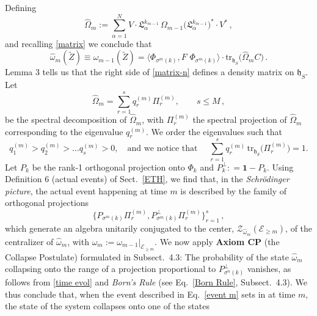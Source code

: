 \documentclass[12pt]{article}
\begin{document}
Defining
\begin{equation}\label{matrix-n}
\widehat{\Omega}_{m}:= \sum_{\alpha=1}^{N} V\cdot \mathfrak{L}_{\alpha}^{k_{m-1}} \, \Omega_{m-1}
\big(\mathfrak{L}_{\alpha}^{k_{m-1}}\big)^{*}\cdot V^{*}\,,
\end{equation}
and recalling \eqref{matrix} we conclude that
\begin{equation}\label{time evol}
\widehat{\omega}_{m}(\tilde{Z})\equiv \omega_{m-1}(\tilde{Z})= \langle \Phi_{\sigma^{m}({k})}, F\,\, \Phi_{\sigma^{m}({k})} \rangle \cdot 
\text{tr}_{\mathfrak{h}_S} \big(\widehat{\Omega}_{m} C\big)\,.
\end{equation}
Lemma 3 tells us that the right side of \eqref{matrix-n} defines a density matrix on $\mathfrak{h}_S$. Let
\begin{equation}\label{spect dec}
\widehat{\Omega}_{m} = \sum_{r=1}^{s} q_{r}^{(m)} \Pi_{r}^{(m)}, \qquad s\leq M\,,
\end{equation}
be the spectral decomposition of $\widehat{\Omega}_m$, with $\Pi_{r}^{(m)}$ the spectral projection of 
$\widehat{\Omega}_m$ corresponding to the eigenvalue $q_{r}^{(m)}$. We order the eigenvalues such that
$$q_{1}^{(m)} > q_{2}^{(m)} > \dots q_{s}^{(m)} > 0,\quad  \text{and we notice that }\quad
\sum_{r=1}^{s} q_{r}^{(m)} \,\text{tr}_{\mathfrak{h}_S}\big(\Pi_{r}^{(m)}\big) =1.$$
Let $P_{{k}}$ be the rank-1 orthogonal projection onto $\Phi_{{k}}$ and 
$P_{{k}}^{\perp}: =\mathbf{1}- P_{{k}}$. Using Definition 6 (actual events) of Sect.~\ref{ETH}, 
we find that, in the \textit{Schr\"odinger picture}, the actual event happening at time $m$ is described  
by the family of orthogonal projections 
\begin{equation}\label{event m}
\big\{P_{\sigma^{m}({k})} \Pi_{r}^{(m)}, P_{\sigma^{m}({k})}^{\perp} \Pi_{r}^{(m)}\big\}_{r=1}^{s}\,,
\end{equation}
which generate an algebra unitarily conjugated to the center, $\mathcal{Z}_{\widehat{\omega}_m}(\mathcal{E}_{\geq m})$, 
of the centralizer of $\widehat{\omega}_m$, with $\widehat{\omega}_m :=\omega_{m-1}\vert_{\mathcal{E}_{\geq m}}$. We now apply {\bf{Axiom CP}} (the Collapse Postulate) formulated in Subsect.~4.3: 
The probability of the state $\widehat{\omega}_m$ collapsing onto the range of a projection proportional to 
$P_{\sigma^{n}({k})}^{\perp}$ vanishes, as follows from \eqref{time evol} and \textit{Born's Rule} 
(see Eq.~\eqref{Born Rule}, Subsect.~4.3). We thus conclude that, when the event described in 
Eq.~\eqref{event m} sets in at time $m$, the state of the system collapses onto one of the states
\end{document}
